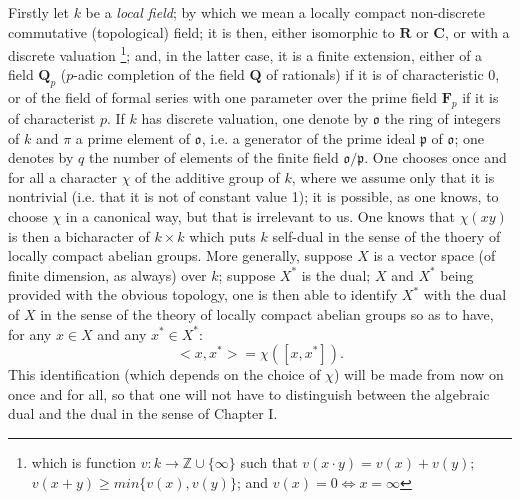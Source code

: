 \documentclass[12pt]{amsart}
\newcounter{ssection}
\renewcommand{\subsection}{
  \addtocounter{ssection}{1}{\bf  \arabic{ssection}.\  }}
\begin{document}
\subsection{}
Firstly let $k$ be a \emph{local field}; by which we mean a locally
compact non-discrete commutative (topological) field; it is then,
either isomorphic to $\mathbf{R}$ or $\mathbf{C}$, or with a discrete
valuation%
\footnote{which is function $v:k\to\mathbb{Z}\cup\{\infty\}$ such that 
$v(x\cdot y)=v(x)+v(y)$;
$v(x+y)\geq min\{v(x),v(y)\}$; and $v(x)=0\Leftrightarrow x=\infty$%
}; and, in the latter case, it is a finite extension, either of a field
$\mathbf{Q}_{p}$ ($p$-adic completion of the field $\mathbf{Q}$
of rationals) if it is of characteristic $0$, or of the field of
formal series with one parameter over the prime field $\mathbf{F}_{p}$
if it is of characterist $p$. If $k$ has discrete valuation, one
denote by $\mathfrak{o}$ the ring of integers of $k$ and $\pi$
a prime element of $\mathfrak{o}$, i.e. a generator of the prime
ideal $\mathfrak{p}$ of $\mathfrak{o}$; one denotes by $q$ the
number of elements of the finite field $\mathfrak{o}/\mathfrak{p}$.
One chooses once and for all a character $\chi$ of the additive group
of $k$, where we assume only that it is nontrivial (i.e. that it
is not of constant value 1); it is possible, as one knows, to choose
$\chi$ in a canonical way, but that is irrelevant to us. One knows
that $\chi(xy)$ is then a bicharacter of $k\times k$ which puts
$k$ self-dual in the sense of the thoery of locally compact abelian
groups. More generally, suppose $X$ is a vector space (of finite
dimension, as always) over $k$; suppose $X^{*}$ is the dual; $X$
and $X^{*}$ being provided with the obvious topology, one is then
able to identify $X^{*}$ with the dual of $X$ in the sense of the
theory of locally compact abelian groups so as to have, for any $x\in X$
and any $x^{*}\in X^{*}$:\[
<x,x^{*}>=\chi([x,x^{*}]).\]
This identification (which depends on the choice of $\chi$) will
be made from now on once and for all, so that one will not have to
distinguish between the algebraic dual and the dual in the sense of
Chapter I.
\end{document}
